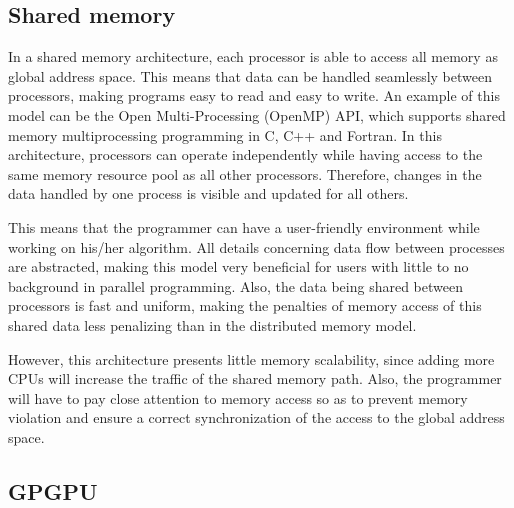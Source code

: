 \documentclass[12pt, openany]{book}
\begin{document}
\subsection{Shared memory}
In a shared memory architecture, each processor is able to access all memory as global address space. This means that data can be handled seamlessly between processors, making programs easy to read and easy to write. An example of this model can be the Open Multi-Processing (OpenMP) API, which supports shared memory multiprocessing programming in C, C++ and Fortran. In this architecture, processors can operate independently while having access to the same memory resource pool as all other processors. Therefore, changes in the data handled by one process is visible and updated for all others. \par
This means that the programmer can have a user-friendly environment while working on his/her algorithm. All details concerning data flow between processes are abstracted, making this model very beneficial for users with little to no background in parallel programming. Also, the data being shared between processors is fast and uniform, making the penalties of memory access of this shared data less penalizing than in the distributed memory model.
\par However, this architecture presents little memory scalability, since adding more CPUs will increase the traffic of the shared memory path. Also, the programmer will have to pay close attention to memory access so as to prevent memory violation and ensure a correct synchronization of the access to the global address space.

\subsection{GPGPU}
\end{document}
